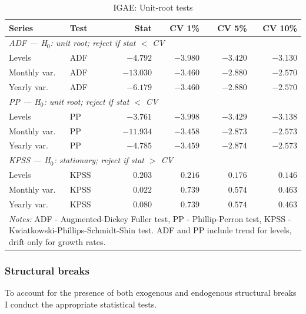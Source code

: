 \documentclass[12pt]{article}
\begin{document}
\begin{table}
\centering
\caption{IGAE: Unit-root tests}\label{tab:unit-root-tests}
\begin{tabular}{llrrrr}
\hline
\textbf{Series} & \textbf{Test} & \textbf{Stat} & \textbf{CV 1\%} & \textbf{CV 5\%} & \textbf{CV 10\%} \\
\hline
\multicolumn{6}{l}{\textit{ADF — H$_0$: unit root; reject if stat $<$ CV}} \\
\hline
Levels           & ADF &  $-4.792$ & $-3.980$ & $-3.420$ & $-3.130$ \\
Monthly var.     & ADF & $-13.030$ & $-3.460$ & $-2.880$ & $-2.570$ \\
Yearly var.       & ADF &  $-6.179$ & $-3.460$ & $-2.880$ & $-2.570$ \\
\hline
\multicolumn{6}{l}{\textit{PP — H$_0$: unit root; reject if stat $<$ CV}} \\
\hline
Levels           & PP  &  $-3.761$ & $-3.998$ & $-3.429$ & $-3.138$ \\
Monthly var.     & PP  & $-11.934$ & $-3.458$ & $-2.873$ & $-2.573$ \\
Yearly var.       & PP  &  $-4.785$ & $-3.459$ & $-2.874$ & $-2.573$ \\
\hline
\multicolumn{6}{l}{\textit{KPSS — H$_0$: stationary; reject if stat $>$ CV}} \\
\hline
Levels           & KPSS &  $0.203$ &  $0.216$ &  $0.176$ &  $0.146$ \\
Monthly var.     & KPSS &  $0.022$ &  $0.739$ &  $0.574$ &  $0.463$ \\
Yearly var.       & KPSS &  $0.080$ &  $0.739$ &  $0.574$ &  $0.463$ \\
\hline
    \multicolumn{6}{l}{
    \parbox{0.65\textwidth}{\footnotesize \textit{Notes:} ADF - Augmented-Dickey Fuller test, PP - Phillip-Perron test, KPSS - Kwiatkowski-Phillips-Schmidt-Shin test. ADF and PP include trend for levels, drift only for growth rates. }} \\
\end{tabular}
\end{table}


\subsubsection*{Structural breaks}\label{sec:structural-breaks}

To account for the presence of both exogenous and endogenous structural breaks I conduct the appropriate statistical tests. 
\end{document}
